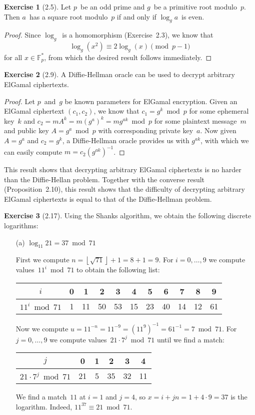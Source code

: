 \documentclass[letterpaper,12pt]{article}
\newcommand{\F}{\mathbb{F}}
\newcommand{\Fp}{\F_{p}}
\newcommand{\Fps}{\Fp^{*}}
\newcommand{\floor}[1]{\left\lfloor{#1}\right\rfloor}
\theoremstyle{definition}
\newtheorem*{exer}{Exercise}
\begin{document}
\begin{exer}[2.5]
Let \(p\)~be an odd prime and \(g\)~be a primitive root modulo~\(p\). Then \(a\)~has a square root modulo~\(p\) if and only if \(\log_g a\)~is even.
\end{exer}
\begin{proof}
Since \(\log_g\)~is a homomorphism (Exercise~2.3), we know that
\[\log_g(x^2)\equiv 2\log_g(x)\pmod{p-1}\]
for all \(x\in\Fps\), from which the desired result follows immediately.
\end{proof}

\begin{exer}[2.9]
A Diffie-Hellman oracle can be used to decrypt arbitrary ElGamal ciphertexts.
\end{exer}
\begin{proof}
Let \(p\)~and~\(g\) be known parameters for ElGamal encryption. Given an ElGamal ciphertext \((c_1,c_2)\), we know that \(c_1=g^k\bmod p\) for some ephemeral key~\(k\) and \(c_2=mA^k=m(g^a)^k=mg^{ak}\bmod p\) for some plaintext message~\(m\) and public key \(A=g^a\bmod p\) with corresponding private key~\(a\). Now given \(A=g^a\) and \(c_2=g^k\), a Diffie-Hellman oracle provides us with \(g^{ak}\), with which we can easily compute \(m=c_2(g^{ak})^{-1}\).
\end{proof}
\noindent This result shows that decrypting arbitrary ElGamal ciphertexts is no harder than the Diffie-Hellan problem. Together with the converse result (Proposition~2.10), this result shows that the difficulty of decrypting arbitrary ElGamal ciphertexts is equal to that of the Diffie-Hellman problem.

\begin{exer}[2.17]
Using the Shanks algorithm, we obtain the following discrete logarithms:
\begin{enumerate}[itemsep=0pt]
\item[(a)] \(\log_{11}21=37\bmod{71}\)

First we compute \(n=\floor{\sqrt{71}}+1=8+1=9\). For \(i=0,\ldots,9\) we compute values~\(11^i\bmod{71}\) to obtain the following list:
\begin{center}
\begin{tabular}{|c|c|c|c|c|c|c|c|c|c|c|}
\hline
\(i\)&0&1&2&3&4&5&6&7&8&9\\
\hline
\(11^i\bmod{71}\)&1&11&50&53&15&23&40&14&12&61\\
\hline
\end{tabular}
\end{center}
Now we compute \(u=11^{-n}=11^{-9}=(11^9)^{-1}=61^{-1}=7\bmod{71}\). For \(j=0,\ldots,9\) we compute values~\(21\cdot 7^j\bmod{71}\) until we find a match:
\begin{center}
\begin{tabular}{|c|c|c|c|c|c|}
\hline
\(j\)&0&1&2&3&4\\
\hline
\(21\cdot 7^j\bmod{71}\)&21&5&35&32&11\\
\hline
\end{tabular}
\end{center}
We find a match~\(11\) at \(i=1\) and \(j=4\), so \(x=i+jn=1+4\cdot 9=37\) is the logarithm. Indeed, \(11^{37}\equiv 21\bmod{71}\).
\end{enumerate}
\end{exer}
\end{document}
